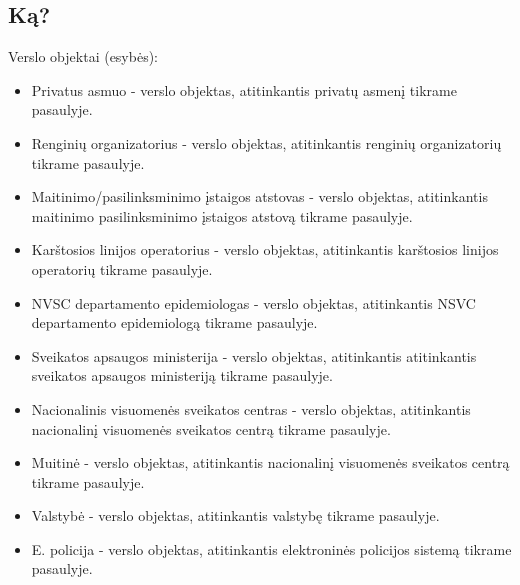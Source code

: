 \documentclass{VUMIFPSkursinis}
\begin{document}
\subsection{Ką?}

Verslo objektai (esybės):
	\begin{itemize}
		\item Privatus asmuo - verslo objektas, atitinkantis privatų asmenį tikrame pasaulyje.
		\item Renginių organizatorius -  verslo objektas, atitinkantis renginių organizatorių tikrame pasaulyje.
		\item Maitinimo/pasilinksminimo įstaigos atstovas - verslo objektas, atitinkantis maitinimo pasilinksminimo įstaigos atstovą tikrame pasaulyje.
		\item Karštosios linijos operatorius - verslo objektas, atitinkantis karštosios linijos operatorių tikrame pasaulyje.
		\item NVSC departamento epidemiologas - verslo objektas, atitinkantis NSVC departamento epidemiologą tikrame pasaulyje.
		\item Sveikatos apsaugos ministerija - verslo objektas, atitinkantis atitinkantis sveikatos apsaugos ministeriją tikrame pasaulyje.
		\item Nacionalinis visuomenės sveikatos centras - verslo objektas, atitinkantis nacionalinį visuomenės sveikatos centrą tikrame pasaulyje.
		\item Muitinė - verslo objektas, atitinkantis nacionalinį visuomenės sveikatos centrą tikrame pasaulyje.
		\item Valstybė - verslo objektas, atitinkantis valstybę tikrame pasaulyje.
		\item E. policija - verslo objektas, atitinkantis elektroninės policijos sistemą tikrame pasaulyje.
	\end{itemize}
	
\end{document}
